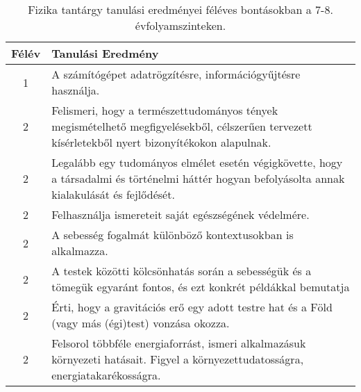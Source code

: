        
           \begin{longtable}{c | p{12cm} }
            \caption[Fizika 7-8.]{Fizika tantárgy tanulási eredményei féléves bontásokban a 7-8. évfolyamszinteken. }  \\

            \textbf{Félév} & \textbf{Tanulási Eredmény} \\
            \hline
            \endhead
                                
                                          1 &  A számítógépet adatrögzítésre, információgyűjtésre használja. \\ \hline
                                      
                                
                                          2 &  Felismeri, hogy a természettudományos tények megismételhető megfigyelésekből, célszerűen tervezett kísérletekből nyert bizonyítékokon alapulnak. \\ \hline
                                          2 &  Legalább egy tudományos elmélet esetén végigkövette, hogy a társadalmi és történelmi háttér hogyan befolyásolta annak kialakulását és fejlődését. \\ \hline
                                          2 &  Felhasználja ismereteit saját egészségének védelmére. \\ \hline
                                          2 &  A sebesség fogalmát különböző kontextusokban is alkalmazza. \\ \hline
                                          2 &  A testek közötti kölcsönhatás során a sebességük és a tömegük egyaránt fontos, és ezt konkrét példákkal bemutatja \\ \hline
                                          2 &  Érti, hogy a gravitációs erő egy adott testre hat és a Föld (vagy más (égi)test) vonzása okozza. \\ \hline
                                          2 &  Felsorol többféle energiaforrást, ismeri alkalmazásuk környezeti hatásait. Figyel a környezettudatosságra, energiatakarékosságra. \\ \hline
                                      

\end{longtable}
